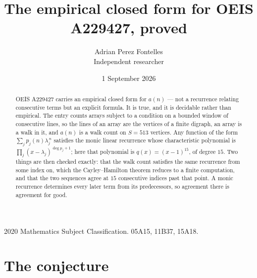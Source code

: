 \documentclass[11pt,a4paper]{article}
\title{The empirical closed form for OEIS A229427, proved}
\author{Adrian Perez Fontelles\\ \small Independent researcher}
\date{1 September 2026}
\theoremstyle{plain}
\theoremstyle{definition}
\begin{document}
\maketitle

\begin{abstract}
OEIS A229427 carries an empirical closed form for $a(n)$ --- not a recurrence relating
consecutive terms but an explicit formula. It is true, and it is decidable rather than
empirical. The entry counts arrays subject to a condition on a bounded window of consecutive lines, so the lines of an array are the
vertices of a finite digraph, an array is a walk in it, and $a(n)$ is a walk count on
$S=513$ vertices. Any function of the form $\sum_j p_j(n)\lambda_j^{\,n}$ satisfies the
monic linear recurrence whose characteristic polynomial is
$\prod_j(x-\lambda_j)^{\deg p_j+1}$; here that polynomial is $q(x)=(x-1)^{15}$, of degree
$15$. Two things are then checked exactly: that the walk count satisfies the same
recurrence from some index on, which the Cayley--Hamilton theorem reduces to a finite
computation, and that the two sequences agree at $15$ consecutive indices past that
point. A monic recurrence determines every later term from its predecessors, so agreement
there is agreement for good.
\end{abstract}

\noindent\small 2020 Mathematics Subject Classification. 05A15, 11B37, 15A18.\normalsize

\section{The conjecture}
\end{document}
